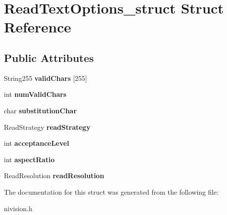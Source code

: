 \hypertarget{structReadTextOptions__struct}{
\section{ReadTextOptions\_\-struct Struct Reference}
\label{structReadTextOptions__struct}
}
\subsection*{Public Attributes}
\begin{DoxyCompactItemize}
\item 
\hypertarget{structReadTextOptions__struct_af0730ab0ea94564eb0b74f01cbddd43e}{
String255 {\bfseries validChars} \mbox{[}255\mbox{]}}
\label{structReadTextOptions__struct_af0730ab0ea94564eb0b74f01cbddd43e}

\item 
\hypertarget{structReadTextOptions__struct_af474dd14a31bb084d89e4b1051942860}{
int {\bfseries numValidChars}}
\label{structReadTextOptions__struct_af474dd14a31bb084d89e4b1051942860}

\item 
\hypertarget{structReadTextOptions__struct_a44a5ecc650d4aa90309c2387661748f7}{
char {\bfseries substitutionChar}}
\label{structReadTextOptions__struct_a44a5ecc650d4aa90309c2387661748f7}

\item 
\hypertarget{structReadTextOptions__struct_afdf3782760c5d97e2c9307143b913831}{
ReadStrategy {\bfseries readStrategy}}
\label{structReadTextOptions__struct_afdf3782760c5d97e2c9307143b913831}

\item 
\hypertarget{structReadTextOptions__struct_aca7ab9ca712358b6f90f23bd7f52ce7b}{
int {\bfseries acceptanceLevel}}
\label{structReadTextOptions__struct_aca7ab9ca712358b6f90f23bd7f52ce7b}

\item 
\hypertarget{structReadTextOptions__struct_aad3b6174909ad4b38bc02a0689d06c33}{
int {\bfseries aspectRatio}}
\label{structReadTextOptions__struct_aad3b6174909ad4b38bc02a0689d06c33}

\item 
\hypertarget{structReadTextOptions__struct_a931b2d3e8a16146cd8946a26f252a4e1}{
ReadResolution {\bfseries readResolution}}
\label{structReadTextOptions__struct_a931b2d3e8a16146cd8946a26f252a4e1}

\end{DoxyCompactItemize}


The documentation for this struct was generated from the following file:\begin{DoxyCompactItemize}
\item 
nivision.h\end{DoxyCompactItemize}
